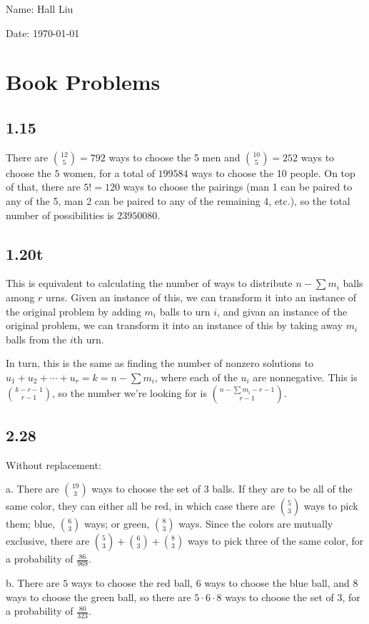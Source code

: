 \documentclass{article}
\begin{document}
Name: Hall Liu

Date: \today 
\vspace{1.5cm}
\section*{Book Problems}
\subsection*{1.15}
There are $\binom{12}{5}=792$ ways to choose the 5 men and $\binom{10}{5}=252$ ways to choose the $5$ women, for a total of $199584$ ways to choose the 10 people. On top of that, there are $5!=120$ ways to choose the pairings (man 1 can be paired to any of the 5, man 2 can be paired to any of the remaining 4, etc.), so the total number of possibilities is $23950080$.
\subsection*{1.20t}
This is equivalent to calculating the number of ways to distribute $n-\sum m_i$ balls among $r$ urns. Given an instance of this, we can transform it into an instance of the original problem by adding $m_i$ balls to urn $i$, and givan an instance of the original problem, we can transform it into an instance of this by taking away $m_i$ balls from the $i$th urn. 

In turn, this is the same as finding the number of nonzero solutions to $u_1+u_2+\cdots+u_r=k=n-\sum m_i$, where each of the $u_i$ are nonnegative. This is $\binom{k-r-1}{r-1}$, so the number we're looking for is $\binom{n-\sum m_i-r-1}{r-1}$.
\subsection*{2.28}
Without replacement: 

a. There are $\binom{19}{3}$ ways to choose the set of $3$ balls. If they are to be all of the same color, they can either all be red, in which case there are $\binom{5}{3}$ ways to pick them; blue, $\binom{6}{3}$ ways; or green, $\binom{8}{3}$ ways. Since the colors are mutually exclusive, there are $\binom{5}{3}+\binom{6}{3}+\binom{8}{3}$ ways to pick three of the same color, for a probability of $\frac{86}{969}$.

b. There are $5$ ways to choose the red ball, $6$ ways to choose the blue ball, and $8$ ways to choose the green ball, so there are $5\cdot6\cdot8$ ways to choose the set of $3$, for a probability of $\frac{80}{323}$.
\end{document}
